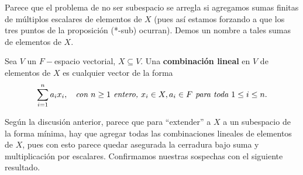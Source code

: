 Parece que el problema de no ser subespacio se arregla
si agregamos sumas finitas de múltiplos escalares de elementos
de $X$ (pues así estamos forzando a que los tres puntos de la 
proposición (*-sub) ocurran). Demos un nombre a tales
sumas de elementos de $X$.

\begin{defi}
Sea $V$ un $F-$espacio vectorial, $X \subseteq V$. Una 
\textbf{combinación lineal} en $V$ de elementos de $X$ es cualquier
vector de la forma
\[
\sum_{i=1}^{n} a_{i}x_{i},
\hspace{0.2cm} \textit{ con }
n \geq 1 \textit{ entero, }
x_{i} \in X, a_{i} \in F
\textit{ para toda } 1 \leq i \leq n.
\] 
\end{defi}

Según la discusión anterior, parece que para ``extender''
a $X$ a un subespacio de la forma mínima, hay que agregar
todas las combinaciones lineales de elementos de $X$, pues con esto
parece quedar asegurada la cerradura bajo suma y multiplicación
por escalares. Confirmamos nuestras sospechas con el siguiente resultado.

